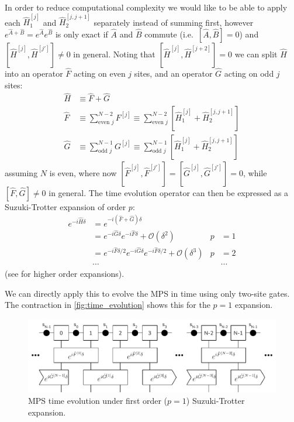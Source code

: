 \documentclass[a4paper, headsepline, footheight=13.6pt]{scrartcl}
\begin{document}
In order to reduce computational complexity we would like to be able to apply each $\hat{H}_1^{[j]}$ and $\hat{H}_2^{[j, j+1]}$ separately instead of summing first, however $e^{\hat{A}+\hat{B}}=e^{\hat{A}}e^{\hat{B}}$ is only exact if $\hat{A}$ and $\hat{B}$ commute (i.e.\ $[\hat{A}, \hat{B}] = 0$) and $[\hat{H}^{[j]}, \hat{H}^{[j']}] \neq 0$ in general. Noting that $[\hat{H}^{[j]}, \hat{H}^{[j+2]}] = 0$ we can split $\hat{H}$ into an operator $\hat{F}$ acting on even $j$ sites, and an operator $\hat{G}$ acting on odd $j$ sites:
\begin{align}
    \hat{H} &\equiv \hat{F} + \hat{G} \\
    \hat{F} &\equiv \sum_{\text{even } j}^{N-2} F^{[j]} \equiv \sum_{\text{even } j}^{N-2} \left[\hat{H}_1^{[j]} + \hat{H}_2^{[j, j+1]}\right] \\
    \hat{G} &\equiv \sum_{\text{odd } j}^{N-1} G^{[j]} \equiv \sum_{\text{odd } j}^{N-1} \left[\hat{H}_1^{[j]} + \hat{H}_2^{[j, j+1]}\right]
\end{align}
assuming $N$ is even, where now $[\hat{F}^{[j]}, \hat{F}^{[j']}] = [\hat{G}^{[j]}, \hat{G}^{[j']}] = 0$, while $[\hat{F}, \hat{G}] \neq 0$ in general. The time evolution operator can then be expressed as a Suzuki-Trotter expansion of order $p$:
\begin{align}
    e^{-i\hat{H}\delta} &= e^{-i(\hat{F}+\hat{G})\delta} && \\
    &= e^{-i\hat{G}\delta} e^{-i\hat{F}\delta} + \mathcal{O}(\delta^2) & p&=1 \\
    &= e^{-i\hat{F}\delta/2} e^{-i\hat{G}\delta} e^{-i\hat{F}\delta/2} + \mathcal{O}(\delta^3) & p&=2 \\
    &\cdots &&\cdots\nonumber
\end{align}
(see \cite{Suzuki:1990aa} for higher order expansions).

We can directly apply this to evolve the MPS in time using only two-site gates. The contraction in \autoref{fig:time_evolution} shows this for the $p=1$ expansion.

\begin{figure}[htbp]
    \centering
    \includegraphics[width=\textwidth]{figures/time_evolution.pdf}
    \caption{MPS time evolution under first order ($p=1$) Suzuki-Trotter expansion.}
    \label{fig:time_evolution}
\end{figure}
\end{document}
